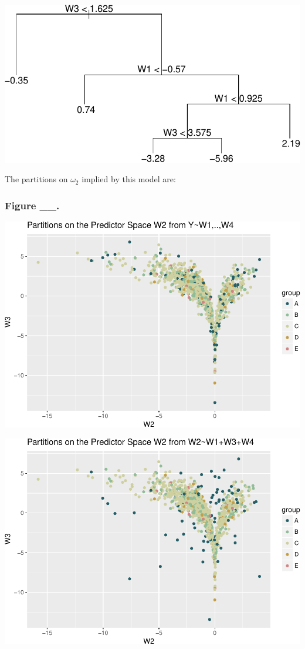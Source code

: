 \documentclass[12pt,twoside]{reedthesis}
\begin{document}
  \includegraphics{Thesis_files/figure-latex/unnamed-chunk-7-1.pdf}
  
  The partitions on \(\omega_2\) implied by this model are:
  
  \subsubsection{Figure \_\_.}\label{figure-__.-1}
  
  \includegraphics{Thesis_files/figure-latex/unnamed-chunk-8-1.pdf}
  
  \includegraphics{Thesis_files/figure-latex/unnamed-chunk-9-1.pdf}
  
\end{document}
